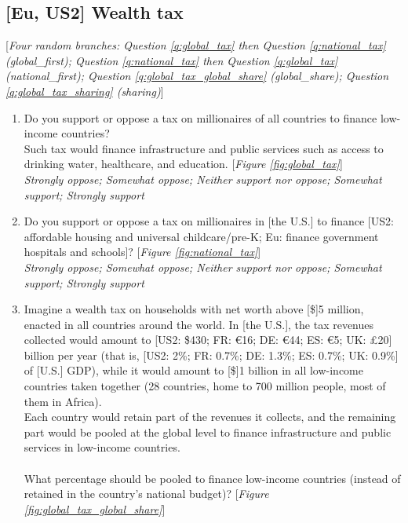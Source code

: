 \subsection*{[Eu, US2] Wealth tax}
[\textit{Four random branches: Question \ref{q:global_tax} then Question \ref{q:national_tax} (global\_first); Question \ref{q:national_tax} then Question \ref{q:global_tax} (national\_first); Question \ref{q:global_tax_global_share} (global\_share); Question \ref{q:global_tax_sharing} (sharing)}]
\begin{enumerate}[resume] 
    \item \label{q:global_tax} Do you support or oppose a tax on millionaires of all countries to finance low-income countries? \\
    Such tax would finance infrastructure and public services such as access to drinking water, healthcare, and education. [\textit{Figure \ref{fig:global_tax}}]
   \\ \textit{Strongly oppose; Somewhat oppose; Neither support nor oppose; Somewhat support; Strongly support}
   \item \label{q:national_tax} Do you support or oppose a tax on millionaires in [the U.S.] to finance [US2: affordable housing and universal childcare/pre-K; Eu: finance government hospitals and schools]?  [\textit{Figure \ref{fig:national_tax}}]
  \\ \textit{Strongly oppose; Somewhat oppose; Neither support nor oppose; Somewhat support; Strongly support}
  \item \label{q:global_tax_global_share} Imagine a wealth tax on households with net worth above [\$]5 million, enacted in all countries around the world.  
  In [the U.S.], the tax revenues collected would amount to [US2: \$430; FR: \euro{}16; DE: \euro{}44; ES: \euro{}5; UK: £20] billion per year (that is, [US2: 2\%; FR: 0.7\%; DE: 1.3\%; ES: 0.7\%; UK: 0.9\%] of [U.S.] GDP), while it would amount to [\$]1 billion in all low-income countries taken together (28 countries, home to 700 million people, most of them in Africa).  \\
  Each country would retain part of the revenues it collects, and the remaining part would be pooled at the global level to finance infrastructure and public services in low-income countries.  \\
     \\
  What percentage should be pooled to finance low-income countries (instead of retained in the country's national budget)?  [\textit{Figure \ref{fig:global_tax_global_share}}]

\end{enumerate}

